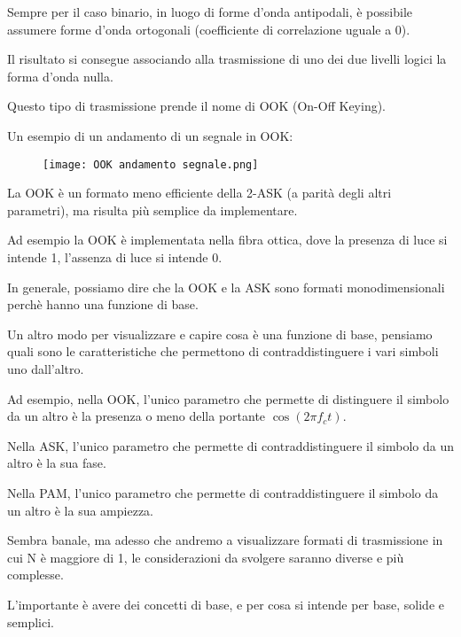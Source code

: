 Sempre per il caso binario, in luogo di forme d'onda antipodali, 
è possibile assumere forme d'onda ortogonali (coefficiente di correlazione uguale a 0). \newline 

Il risultato si consegue associando alla trasmissione di uno dei due livelli logici la forma d'onda nulla. \newline 

Questo tipo di trasmissione prende il nome di OOK (On-Off Keying). \newline 

Un esempio di un andamento di un segnale in OOK: 

\begin{figure}[h]
    \centering
    \texttt{[image: OOK andamento segnale.png]}
\end{figure}

La OOK è un formato meno efficiente della 2-ASK (a parità degli altri parametri), 
ma risulta più semplice da implementare. \newline 

Ad esempio la OOK è implementata nella fibra ottica, dove la presenza di luce si intende 1, 
l'assenza di luce si intende 0. \newline 

In generale, possiamo dire che la OOK e la ASK sono formati monodimensionali perchè hanno una funzione di base. \newline 

\begin{tcolorbox}
    Un altro modo per visualizzare e capire cosa è una funzione di base, 
    pensiamo quali sono le caratteristiche che permettono di contraddistinguere i vari simboli uno dall'altro. \newline 

    Ad esempio, nella OOK, l'unico parametro che permette di distinguere il simbolo da un altro è la presenza o meno della portante $\cos(2 \pi f_c t)$. \newline 

    Nella ASK, l'unico parametro che permette di contraddistinguere il simbolo da un altro è la sua fase. \newline 

    Nella PAM, l'unico parametro che permette di contraddistinguere il simbolo da un altro è la sua ampiezza. \newline 

    Sembra banale, ma adesso che andremo a visualizzare formati di trasmissione in cui N è maggiore di 1, le considerazioni da svolgere saranno diverse e più complesse. \newline 

    L'importante è avere dei concetti di base, e per cosa si intende per base, solide e semplici. 
\end{tcolorbox}

